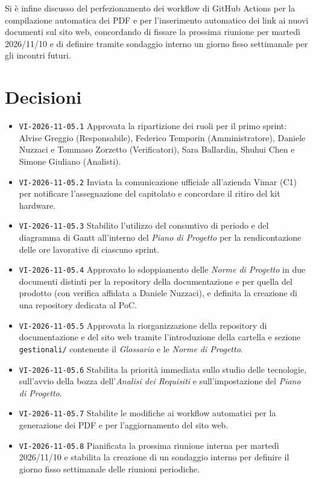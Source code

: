 \documentclass[11pt, a4paper]{article}
\begin{document}
Si è infine discusso del perfezionamento dei workflow di GitHub Actions per la compilazione automatica dei PDF e per l'inserimento automatico dei link ai nuovi documenti sul sito web, concordando di fissare la prossima riunione per martedì 2026/11/10 e di definire tramite sondaggio interno un giorno fisso settimanale per gli incontri futuri.

\section{Decisioni}
\begin{itemize}
    \item \texttt{VI-2026-11-05.1} Approvata la ripartizione dei ruoli per il primo sprint: Alvise Greggio (Responsabile), Federico Temporin (Amministratore), Daniele Nuzzaci e Tommaso Zorzetto (Verificatori), Sara Ballardin, Shuhui Chen e Simone Giuliano (Analisti).
    \item \texttt{VI-2026-11-05.2} Inviata la comunicazione ufficiale all'azienda Vimar (C1) per notificare l'assegnazione del capitolato e concordare il ritiro del kit hardware.
    \item \texttt{VI-2026-11-05.3} Stabilito l'utilizzo del consuntivo di periodo e del diagramma di Gantt all'interno del \textit{Piano di Progetto} per la rendicontazione delle ore lavorative di ciascuno sprint.
    \item \texttt{VI-2026-11-05.4} Approvato lo sdoppiamento delle \textit{Norme di Progetto} in due documenti distinti per la repository della documentazione e per quella del prodotto (con verifica affidata a Daniele Nuzzaci), e definita la creazione di una repository dedicata al PoC.
    \item \texttt{VI-2026-11-05.5} Approvata la riorganizzazione della repository di documentazione e del sito web tramite l'introduzione della cartella e sezione \texttt{gestionali/} contenente il \textit{Glossario} e le \textit{Norme di Progetto}.
    \item \texttt{VI-2026-11-05.6} Stabilita la priorità immediata sullo studio delle tecnologie, sull'avvio della bozza dell'\textit{Analisi dei Requisiti} e sull'impostazione del \textit{Piano di Progetto}.
    \item \texttt{VI-2026-11-05.7} Stabilite le modifiche ai workflow automatici per la generazione dei PDF e per l'aggiornamento del sito web.
    \item \texttt{VI-2026-11-05.8} Pianificata la prossima riunione interna per martedì 2026/11/10 e stabilita la creazione di un sondaggio interno per definire il giorno fisso settimanale delle riunioni periodiche.
\end{itemize}
\end{document}
